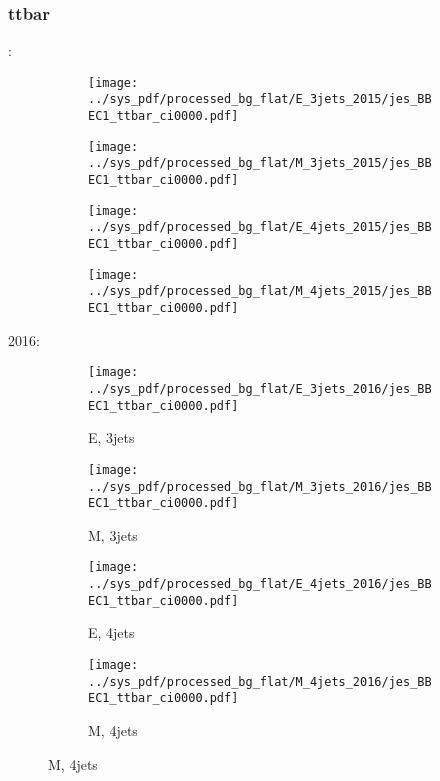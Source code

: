 \documentclass{beamer}
\begin{document}
\begin{frame}
\frametitle{ttbar}
\fontsize{5}{1}:
\begin{figure}
\centering
\begin{subfigure}[b]{0.24\textwidth}
\texttt{[image: ../sys\_pdf/processed\_bg\_flat/E\_3jets\_2015/jes\_BBEC1\_ttbar\_ci0000.pdf]}
\end{subfigure}
\begin{subfigure}[b]{0.24\textwidth}
\texttt{[image: ../sys\_pdf/processed\_bg\_flat/M\_3jets\_2015/jes\_BBEC1\_ttbar\_ci0000.pdf]}
\end{subfigure}
\begin{subfigure}[b]{0.24\textwidth}
\texttt{[image: ../sys\_pdf/processed\_bg\_flat/E\_4jets\_2015/jes\_BBEC1\_ttbar\_ci0000.pdf]}
\end{subfigure}
\begin{subfigure}[b]{0.24\textwidth}
\texttt{[image: ../sys\_pdf/processed\_bg\_flat/M\_4jets\_2015/jes\_BBEC1\_ttbar\_ci0000.pdf]}
\end{subfigure}
\end{figure}
2016:
\begin{figure}
\centering
\begin{subfigure}[b]{0.24\textwidth}
\texttt{[image: ../sys\_pdf/processed\_bg\_flat/E\_3jets\_2016/jes\_BBEC1\_ttbar\_ci0000.pdf]}
\captionsetup{font=tiny}
\caption{E, 3jets}
\end{subfigure}
\begin{subfigure}[b]{0.24\textwidth}
\texttt{[image: ../sys\_pdf/processed\_bg\_flat/M\_3jets\_2016/jes\_BBEC1\_ttbar\_ci0000.pdf]}
\captionsetup{font=tiny}
\caption{M, 3jets}
\end{subfigure}
\begin{subfigure}[b]{0.24\textwidth}
\texttt{[image: ../sys\_pdf/processed\_bg\_flat/E\_4jets\_2016/jes\_BBEC1\_ttbar\_ci0000.pdf]}
\captionsetup{font=tiny}
\caption{E, 4jets}
\end{subfigure}
\begin{subfigure}[b]{0.24\textwidth}
\texttt{[image: ../sys\_pdf/processed\_bg\_flat/M\_4jets\_2016/jes\_BBEC1\_ttbar\_ci0000.pdf]}
\captionsetup{font=tiny}
\caption{M, 4jets}
\end{subfigure}
\end{figure}
\end{frame}
\end{document}
